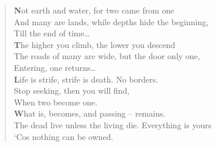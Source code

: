 

\begin{verse}
\unclfamily\large{\bfseries{N}}\small{ot earth and water, for two came from one\\
And many are lands, while depths hide the beginning,\\
Till the end of time\ldots}\\[2ex]

\unclfamily\large{\bfseries T}\unclfamily\small{he higher you climb, the lower you descend\\
The roads of many are wide, but the door only one,\\
Entering, one returns\ldots}\\[2ex]

\unclfamily\normalsize{\bfseries L}\unclfamily\small{ife is strife, strife is death. No borders. \\
Stop seeking, then you will find, \\
When two become one.}\\[2ex]

\unclfamily\large{\bfseries W}\unclfamily\small{hat is, becomes, and passing -- remains.\\
The dead live unless the living die. 
Everything is yours\\
`Cos nothing can be owned.}
\end{verse}



%

